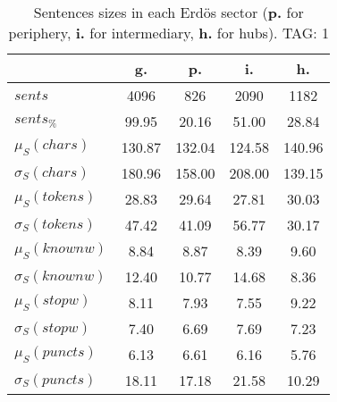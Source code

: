 \begin{table}[h!]
\begin{center}
\begin{tabular}{| l | c | c | c | c |}\hline
 & g. & p. & i. & h. \\\hline
$sents$ & 4096  & 826  & 2090  & 1182 \\\hline
$sents_{\%}$ & 99.95  & 20.16  & 51.00  & 28.84 \\\hline
$\mu_S(chars)$ & 130.87  & 132.04  & 124.58  & 140.96 \\\hline
$\sigma_S(chars)$ & 180.96  & 158.00  & 208.00  & 139.15 \\\hline
$\mu_S(tokens)$ & 28.83  & 29.64  & 27.81  & 30.03 \\\hline
$\sigma_S(tokens)$ & 47.42  & 41.09  & 56.77  & 30.17 \\\hline
$\mu_S(knownw)$ & 8.84  & 8.87  & 8.39  & 9.60 \\\hline
$\sigma_S(knownw)$ & 12.40  & 10.77  & 14.68  & 8.36 \\\hline
$\mu_S(stopw)$ & 8.11  & 7.93  & 7.55  & 9.22 \\\hline
$\sigma_S(stopw)$ & 7.40  & 6.69  & 7.69  & 7.23 \\\hline
$\mu_S(puncts)$ & 6.13  & 6.61  & 6.16  & 5.76 \\\hline
$\sigma_S(puncts)$ & 18.11  & 17.18  & 21.58  & 10.29 \\\hline
\end{tabular}
\caption{Sentences sizes in each Erd\"os sector ({{\bf p.}} for periphery, {{\bf i.}} for intermediary, {{\bf h.}} for hubs). TAG: 1}
\end{center}
\end{table}